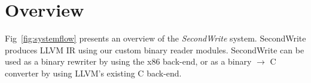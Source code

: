 \section{Overview}
\label{sec:Overview}

Fig~\ref{fig:systemflow} presents an overview of the \emph{SecondWrite} system. SecondWrite produces LLVM IR using our custom binary reader modules. SecondWrite can be used as a binary rewriter by using the x86 back-end, or as a binary $\rightarrow$ C converter by using LLVM's existing C back-end.



